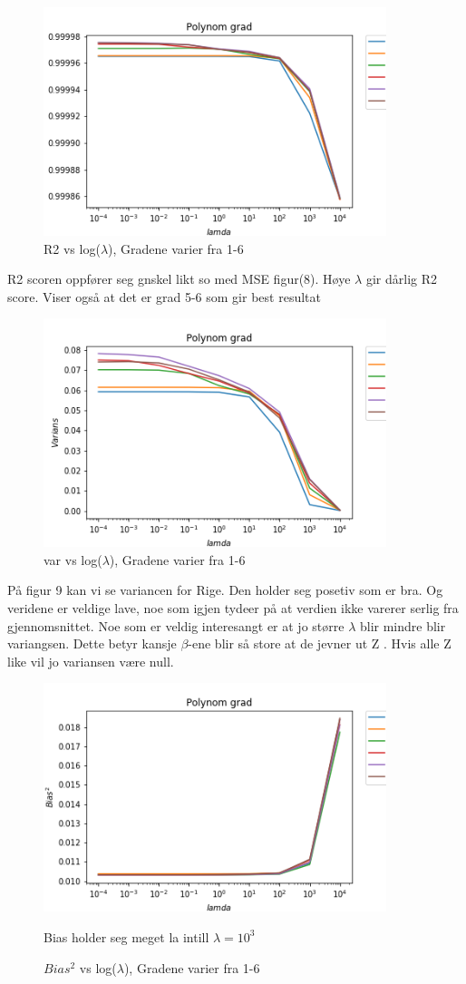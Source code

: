 \documentclass[norsk,a4paper,12pt]{article}
\begin{document}
\begin{figure}[H]
\includegraphics[width=100mm]{r2(R)}
\caption{R2 vs log($\lambda$), Gradene varier fra 1-6  }
\end{figure}
R2 scoren oppfører seg gnskel likt so med MSE figur(8). Høye $\lambda$ gir dårlig R2 score. Viser også at det er grad 5-6 som gir best resultat
\begin{figure}[H]
\includegraphics[width=100mm]{var(R)}
\caption{var vs log($\lambda$), Gradene varier fra 1-6 }
\end{figure}
På figur 9 kan vi se variancen for Rige. Den holder seg posetiv som er bra. Og veridene er veldige lave, noe som igjen tydeer på at verdien ikke varerer serlig fra gjennomsnittet. Noe som er veldig interesangt er at jo større $\lambda$ blir mindre blir variangsen. Dette betyr kansje $\beta$-ene blir så store at de jevner ut Z . Hvis alle Z like vil jo variansen være null. 
\begin{figure}[H]
\includegraphics[width=100mm]{Bias(R)}
\caption{$Bias^2$ vs log($\lambda$), Gradene varier fra 1-6 }
Bias holder seg meget la intill  $\lambda = 10^3$ 


\end{figure}
\end{document}
